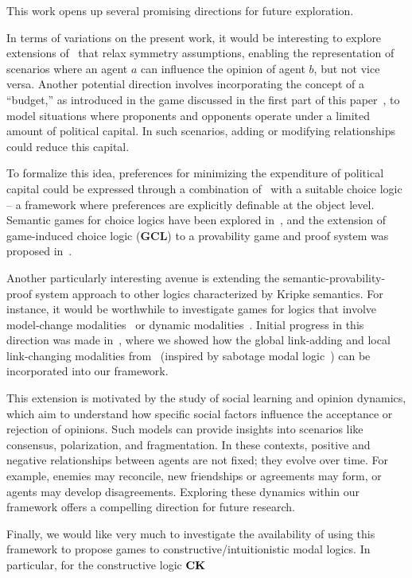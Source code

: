 
This work opens up several promising directions for future exploration.

In terms of variations on the present work, it would be interesting to explore extensions of \PNL\ that relax symmetry assumptions, enabling the representation of scenarios where an agent $a$ can influence the opinion of agent $b$, but not vice versa. Another potential direction involves incorporating the concept of a ``budget,'' as introduced in the game discussed in the first part of this paper~\cite{DBLP:conf/tableaux/LangOPF19}, to model situations where proponents and opponents operate under a limited amount of political capital. In such scenarios, adding or modifying relationships could reduce this capital.

To formalize this idea, preferences for minimizing the expenditure of political capital could be expressed through a combination of \PNL\ with a suitable choice logic -- a framework where preferences are explicitly definable at the object level. Semantic games for choice logics have been explored in~\cite{Freiman2023TruthLogic}, and the extension of game-induced choice logic (\textbf{GCL}) to a provability game and proof system was proposed in~\cite{Freiman2023}. 

Another particularly interesting avenue is extending the semantic-provability-proof system approach to other logics characterized by Kripke semantics. For instance, it would be worthwhile to investigate games for logics that involve model-change modalities~\cite{DBLP:journals/logcom/Velazquez-Quesada17,DBLP:journals/igpl/PerrotinV21} or dynamic modalities~\cite{DBLP:journals/synthese/BenthemGL08}. Initial progress in this direction was made in~\cite{LPAR2024:Reasoning_About_Group_Polarization}, where we showed how the global link-adding and local link-changing modalities from~\cite{DBLP:journals/logcom/PedersenSA21} (inspired by sabotage modal logic~\cite{DBLP:journals/igpl/ArecesFH15,DBLP:journals/logcom/AucherBG18,DBLP:journals/logcom/BenthemLSY23}) can be incorporated into our framework.

This extension is motivated by the study of social learning and opinion dynamics, which aim to understand how specific social factors influence the acceptance or rejection of opinions. Such models can provide insights into scenarios like consensus, polarization, and fragmentation. In these contexts, positive and negative relationships between agents are not fixed; they evolve over time. For example, enemies may reconcile, new friendships or agreements may form, or agents may develop disagreements. Exploring these dynamics within our framework offers a compelling direction for future research. 

Finally, we would like very much to investigate the availability of using this framework to propose games to constructive/intuitionistic modal logics. In particular, for the constructive logic $\textbf{CK}$~\cite{DBLP:conf/eumas/AcclavioC23}